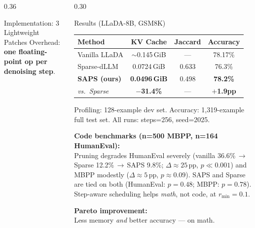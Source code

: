 \documentclass[final]{beamer}
\begin{document}
\begin{frame}[t]{}
\begin{columns}[t,totalwidth=\linewidth]
\begin{column}{0.36\linewidth}
\begin{block}{Implementation: 3 Lightweight Patches}
    \vspace{0.4em}
    Overhead: \textbf{one floating-point op per denoising step}.
  \end{block}

\end{column}

\begin{column}{0.30\linewidth}

  \begin{block}{Results (LLaDA-8B, GSM8K)}

    \begin{center}
    \begin{tabular}{lccc}
      \toprule
      \textbf{Method} & \textbf{KV Cache} & \textbf{Jaccard} & \textbf{Accuracy} \\
      \midrule
      Vanilla LLaDA   & $\sim$0.145\,GiB & — & 78.17\% \\
      Sparse-dLLM     & 0.0724\,GiB      & 0.633 & 76.3\% \\
      \rowcolor{accentGreen!18}
      \textbf{SAPS (ours)} & \textbf{0.0496\,GiB} & 0.498 & \textbf{78.2\%} \\
      \midrule
      \rowcolor{accentGreen!10}
      \textit{vs.\ Sparse} & {\color{accentGreen}\textbf{$-$31.4\%}} & — & {\color{accentGreen}\textbf{$+$1.9pp}} \\
      \bottomrule
    \end{tabular}
    \end{center}

    \vspace{0.5em}
    {\small Profiling: 128-example dev set.\;
            Accuracy: 1{,}319-example full test set.\;
            All runs: steps=256, seed=2025.}

    \vspace{0.6em}
    \textbf{Code benchmarks (n=500 MBPP, n=164 HumanEval):}\\[0.3em]
    {\small Pruning degrades HumanEval severely (vanilla 36.6\%\,$\to$\,Sparse 12.2\%\,$\to$\,SAPS 9.8\%;
    $\Delta{\approx}25$\,pp, $p{\ll}0.001$) and MBPP modestly ($\Delta{\approx}5$\,pp, $p{\approx}0.09$).
    SAPS and Sparse are tied on both (HumanEval: $p{=}0.48$; MBPP: $p{=}0.78$).
    Step-aware scheduling helps \emph{math}, not code, at $r_{\min}{=}0.1$.}

    \vspace{0.8em}
    {\large\color{cmuRed}\textbf{Pareto improvement:}\\
    Less memory \emph{and} better accuracy — on math.}
  \end{block}


\end{column}
\end{columns}
\end{frame}
\end{document}
